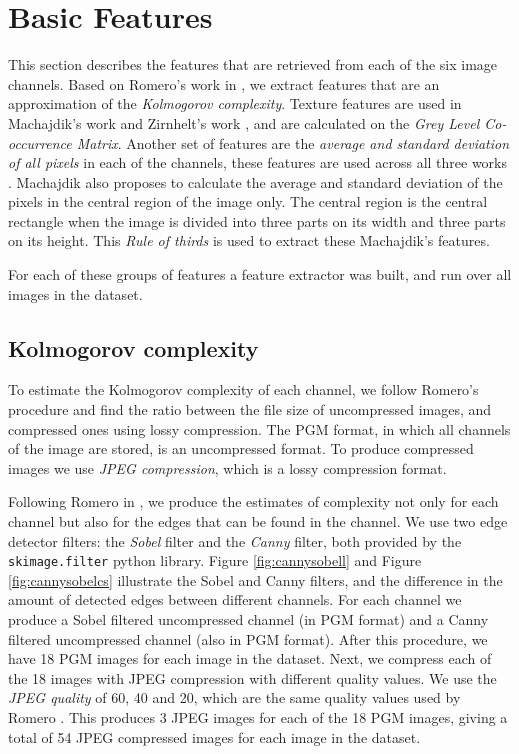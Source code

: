 \documentclass[11pt,a4paper,twoside,openright]{report}
\begin{document}
\section{Basic Features}

This section describes the features that are retrieved from each of the six
image channels.  Based on Romero's work in \cite{rmc12ajs}, we extract features
that are an approximation of the \emph{Kolmogorov complexity}.  Texture
features are used in Machajdik's work \cite{mach10clas} and Zirnhelt's work
\cite{zirnhelt07art}, and are calculated on the \emph{Grey Level Co-occurrence
Matrix}.  Another set of features are the \emph{average and standard deviation
of all pixels} in each of the channels, these features are used across all
three works \cite{jma12clas,zirnhelt07art,mach10clas}.  Machajdik
\cite{mach10clas} also proposes to calculate the average and standard deviation
of the pixels in the central region of the image only.  The central region is
the central rectangle when the image is divided into three parts on its width
and three parts on its height.  This \emph{Rule of thirds} is used to extract
these Machajdik's features.

For each of these groups of features a feature extractor was built, and run
over all images in the dataset.

\subsection{Kolmogorov complexity}

To estimate the Kolmogorov complexity of each channel, we follow Romero's
procedure \cite{jma12clas} and find the ratio between the file size of
uncompressed images, and compressed ones using lossy compression.  The PGM
format, in which all channels of the image are stored, is an uncompressed
format.  To produce compressed images we use \emph{JPEG compression}, which is
a lossy compression format.

Following Romero in \cite{jma12clas}, we produce the estimates of complexity
not only for each channel but also for the edges that can be found in the
channel.  We use two edge detector filters: the \emph{Sobel} filter and the
\emph{Canny} filter, both provided by the \texttt{skimage.filter} python
library.  Figure \ref{fig:cannysobell} and Figure \ref{fig:cannysobelcs}
illustrate the Sobel and Canny filters, and the difference in the amount of
detected edges between different channels.  For each channel we produce a Sobel
filtered uncompressed channel (in PGM format) and a Canny filtered uncompressed
channel (also in PGM format).  After this procedure, we have 18 PGM images for
each image in the dataset.  Next, we compress each of the 18 images with JPEG
compression with different quality values.  We use the \emph{JPEG quality} of
60, 40 and 20, which are the same quality values used by Romero
\cite{jma12clas}.  This produces 3 JPEG images for each of the 18 PGM images,
giving a total of 54 JPEG compressed images for each image in the dataset.
\end{document}
